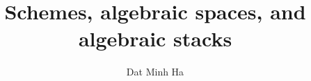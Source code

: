 

\setcounter{section}{-1}





	\title{Schemes, algebraic spaces, and algebraic stacks}
	
	\author{Dat Minh Ha}
	\maketitle
	
	\begin{abstract}
	    
	\end{abstract}
	
	{
      \hypersetup{} 
      \tableofcontents %
    }
    
    
    
    
    
    
    
    
	
	\printbibliography

